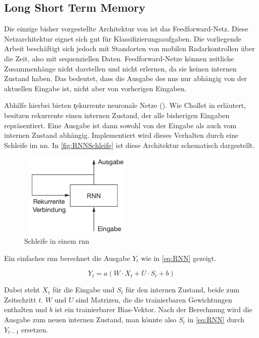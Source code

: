 \subsection{Long Short Term Memory}
\label{sec:LSTM}

Die einzige bisher vorgestellte Architektur von  ist das Feedforward-Netz.
Diese Netzarchitektur eignet sich gut für Klassifizierungsaufgaben.
Die vorliegende Arbeit beschäftigt sich jedoch mit Standorten von mobilen Radarkontrollen über die Zeit, also mit sequenziellen Daten.
Feedforward-Netze können zeitliche Zusammenhänge nicht darstellen und nicht erlernen, da sie keinen internen Zustand haben.
Das bedeutet, dass die Ausgabe des \acrshort{nn}s nur abhängig von der aktuellen Eingabe ist, nicht aber von vorherigen Eingaben.

Abhilfe hierbei bieten \k{rekurrente neuronale Netze} ().
Wie Chollet in \cite[S. 252]{DeepLearningPythonKeras} erläutert, besitzen rekurrente  einen internen Zustand, der alle bisherigen Eingaben repräsentiert.
Eine Ausgabe ist dann sowohl von der Eingabe als auch vom internen Zustand abhängig.
Implementiert wird dieses Verhalten durch eine Schleife im \acrshort{nn}.
In \autoref{fig:RNNSchleife} ist diese Architektur schematisch dargestellt.

\begin{figure}[h]
    \centering
    \includegraphics[width=0.5\textwidth,height=4cm,keepaspectratio=true]{content/images/RNNSchleife.png}
    \caption{Schleife in einem \acrshort{rnn} \cite[Abb. 6.9]{DeepLearningPythonKeras}}
    \label{fig:RNNSchleife}
\end{figure}

Ein einfaches \acrshort{rnn} berechnet die Ausgabe $Y_t$ wie in \autoref{eq:RNN} \cite[S. 253]{DeepLearningPythonKeras} gezeigt.

\begin{equation}
    Y_t = a(W \cdot X_t + U \cdot S_t + b)
\label{eq:RNN}
\end{equation}

Dabei steht $X_t$ für die Eingabe und $S_t$ für den internen Zustand, beide zum Zeitschritt $t$.
$W$ und $U$ sind Matrizen, die die trainierbaren Gewichtungen enthalten und $b$ ist ein trainierbarer Bias-Vektor.
Nach der Berechnung wird die Ausgabe zum neuen internen Zustand, man könnte also $S_t$ in \autoref{eq:RNN} durch $Y_{t-1}$ ersetzen.

